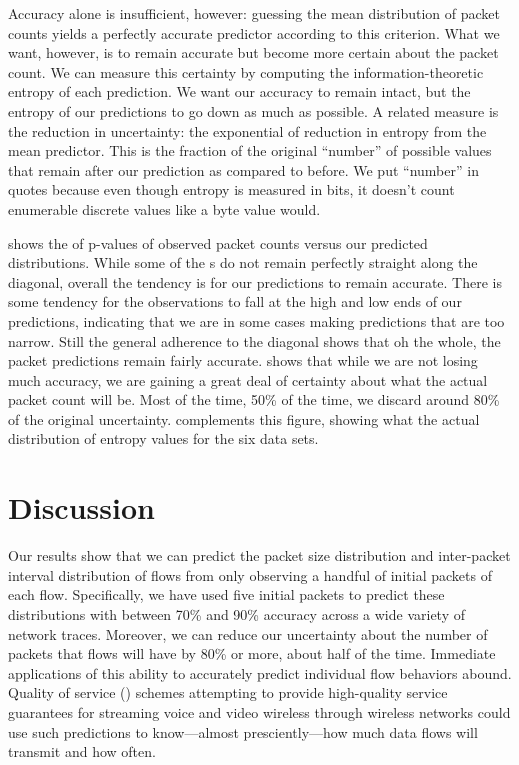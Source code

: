 \documentclass[conference]{IEEEtran}
\begin{document}
Accuracy alone is insufficient, however:
guessing the mean distribution of packet counts yields a perfectly accurate predictor according to this criterion.
What we want, however, is to remain accurate but become more certain about the packet count.
We can measure this certainty by computing the information-theoretic entropy of each prediction.
We want our accuracy to remain intact, but the entropy of our predictions to go down as much as possible.
A related measure is the reduction in uncertainty:
the exponential of reduction in entropy from the mean predictor.
This is the fraction of the original ``number'' of possible values that remain after our prediction as compared to before.
We put ``number'' in quotes because even though entropy is measured in bits, it doesn't count enumerable discrete values like a byte value would.

 shows the  of p-values of observed packet counts versus our predicted distributions.
While some of the s do not remain perfectly straight along the diagonal, overall the tendency is for our predictions to remain accurate.
There is some tendency for the observations to fall at the high and low ends of our predictions, indicating that we are in some cases making predictions that are too narrow.
Still the general adherence to the diagonal shows that oh the whole, the packet predictions remain fairly accurate.
 shows that while we are not losing much accuracy, we are gaining a great deal of certainty about what the actual packet count will be.
Most of the time, 50\% of the time, we discard around 80\% of the original uncertainty.
 complements this figure, showing what the actual distribution of entropy values for the six data sets.

\section{Discussion}

Our results show that we can predict the packet size distribution and inter-packet interval distribution of flows from only observing a handful of initial packets of each flow.
Specifically, we have used five initial packets to predict these distributions with between 70\% and 90\% accuracy across a wide variety of network traces.
Moreover, we can reduce our uncertainty about the number of packets that flows will have by 80\% or more, about half of the time.
Immediate applications of this ability to accurately predict individual flow behaviors abound.
Quality of service () schemes attempting to provide high-quality service guarantees for streaming voice and video wireless through wireless networks could use such predictions to know---almost presciently---how much data flows will transmit and how often.
\end{document}
